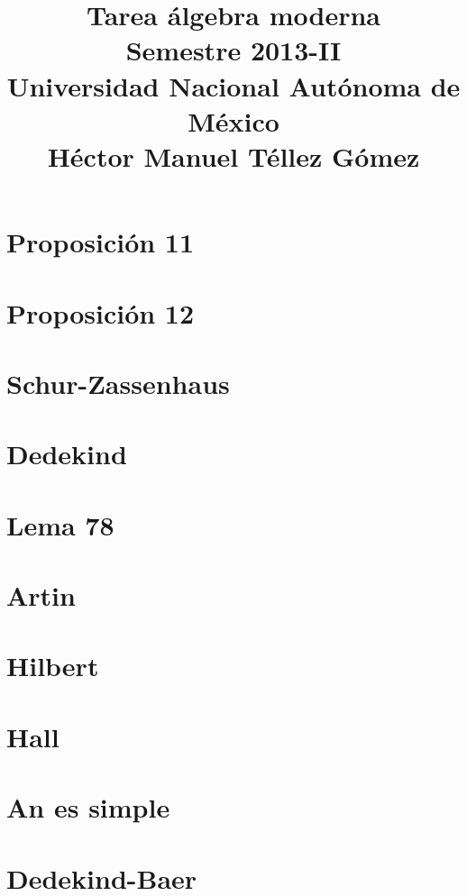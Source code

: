 \documentclass[a5paper,oneside]{amsart}
\title[Tarea álgebra moderna]{Tarea álgebra moderna\\ Semestre 2013-II\\ Universidad Nacional Autónoma de México\\ Héctor Manuel Téllez Gómez}
\theoremstyle{dotless}
\begin{document}
	\maketitle
    
	\section*{Proposición 11}
        
        \newpage
	
    \section*{Proposición 12}
        
        \newpage
    
    \section*{Schur-Zassenhaus}
        
        \newpage
        
    \section*{Dedekind}
        
        \newpage        
        
    \section*{Lema 78}
        
        \newpage
                 
    \section*{Artin}
                
        \newpage

    \section*{Hilbert}
                
        \newpage

    \section*{Hall}
                
        \newpage

    \section*{An es simple}
        
        \newpage

    \section*{Dedekind-Baer}
        
\end{document}
